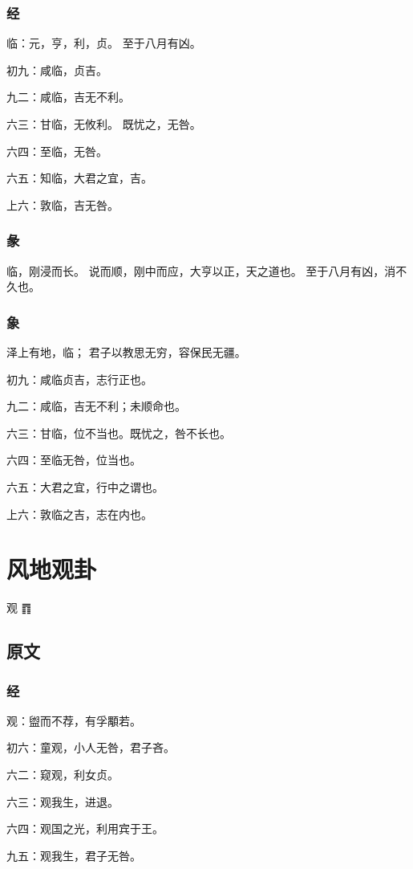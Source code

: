 \documentclass[12pt,oneside]{book}
\begin{document}
\subsection{经}
临：元，亨，利，贞。 至于八月有凶。

初九：咸临，贞吉。

九二：咸临，吉无不利。

六三：甘临，无攸利。 既忧之，无咎。

六四：至临，无咎。

六五：知临，大君之宜，吉。

上六：敦临，吉无咎。

\subsection{彖}
临，刚浸而长。 说而顺，刚中而应，大亨以正，天之道也。 至于八月有凶，消不久也。

\subsection{象}
泽上有地，临； 君子以教思无穷，容保民无疆。

初九：咸临贞吉，志行正也。

九二：咸临，吉无不利；未顺命也。

六三：甘临，位不当也。既忧之，咎不长也。

六四：至临无咎，位当也。

六五：大君之宜，行中之谓也。

上六：敦临之吉，志在内也。


\chapter{风地观卦}
观 {\Large ䷓}

\section{原文}

\subsection{经}
观：盥而不荐，有孚顒若。

初六：童观，小人无咎，君子吝。

六二：窥观，利女贞。

六三：观我生，进退。

六四：观国之光，利用宾于王。

九五：观我生，君子无咎。
\end{document}
